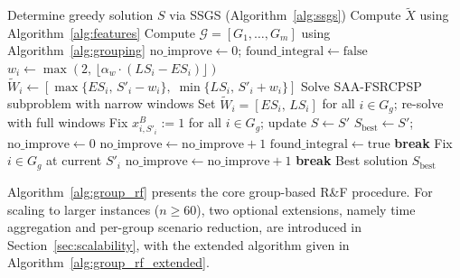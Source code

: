 \begin{algorithm}[H]
\caption{Procedure of the proposed group-based
         activity-oriented R\&F}
\label{alg:group_rf}
\begin{algorithmic}[1]
\State Determine greedy solution $S$ via SSGS
       (Algorithm~\ref{alg:ssgs})
\State Compute $\tilde{X}$ using Algorithm~\ref{alg:features}
\State Compute $\mathcal{G}=[G_1,\ldots,G_m]$
       using Algorithm~\ref{alg:grouping}
\State $\mathrm{no\_improve} \leftarrow 0$;\;
       $\mathrm{found\_integral} \leftarrow \mathrm{false}$
        \State $w_i \leftarrow \max(2,\,\lfloor \alpha_w \cdot
               (LS_i-ES_i)\rfloor)$
        \State $\widetilde{W}_i \leftarrow
               [\max\{ES_i,\,S'_i-w_i\},\;
                \min\{LS_i,\,S'_i+w_i\}]$
    \EndFor
    \State Solve SAA-FSRCPSP subproblem with narrow windows
        \State Set $\widetilde{W}_i=[ES_i,\,LS_i]$
               for all $i\in G_g$; re-solve with full windows
    \EndIf
        \State Fix $x^B_{i,S'_i}:=1$ for all $i \in G_g$;\;
               update $S \leftarrow S'$
            \State $S_{\mathrm{best}} \leftarrow S'$;\;
                   $\mathrm{no\_improve} \leftarrow 0$
            \State $\mathrm{no\_improve} \leftarrow
                   \mathrm{no\_improve} + 1$
        \EndIf
        \State $\mathrm{found\_integral} \leftarrow \mathrm{true}$
            \State \textbf{break}
        \EndIf
    \Else
        \State Fix $i\in G_g$ at current $S'_i$
            $\mathrm{no\_improve} \leftarrow
            \mathrm{no\_improve} + 1$
        \EndIf
    \EndIf
        \State \textbf{break}
    \EndIf
\EndFor
\State \Return Best solution $S_{\mathrm{best}}$
\end{algorithmic}
\end{algorithm}
\noindent Algorithm~\ref{alg:group_rf} presents the core
group-based R\&F procedure. For scaling to larger instances
($n \geq 60$), two optional extensions, namely time aggregation and
per-group scenario reduction, are introduced in
Section~\ref{sec:scalability}, with the extended algorithm
given in Algorithm~\ref{alg:group_rf_extended}.
